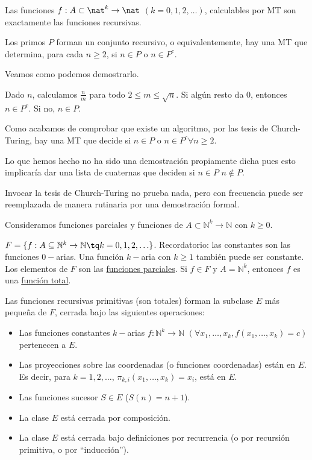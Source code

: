 \begin{theorem}
	Las funciones $f:A\subset\nat^k\to \nat$ $(k=0,1,2,\hdots)$, calculables por MT son exactamente las funciones recursivas.
\end{theorem}

\begin{example}
	Los primos $P$ forman un conjunto recursivo, o equivalentemente, hay una MT que determina, para cada $n\ge2$, si $n\in P$ o $n\in P^c$.

	Veamos como podemos demostrarlo.

	Dado $n$, calculamos $\frac{n}{m}$ para todo $2\le m\le \sqrt{n}$. Si algún resto da $0$, entonces $n\in P^c$. Si no, $n\in P$.

	Como acabamos de comprobar que existe un algoritmo, por las tesis de Church-Turing, hay una MT que decide si $n\in P$ o $n\in P^c \forall n\ge 2$.

	Lo que hemos hecho no ha sido una demostración propiamente dicha pues esto implicaría dar una lista de cuaternas que deciden si $n\in P$  $n\notin P$.
\end{example}

Invocar la tesis de Church-Turing no prueba nada, pero con frecuencia puede ser reemplazada de manera rutinaria por una demostración formal.

Consideramos funciones parciales y funciones de $A\subset\mathbb{N}^k\to \mathbb{N}$ con $k\ge 0$.

\begin{defn}
	$F=\{f:A\subseteq\mathbb{N}^k\to\mathbb{N}\tq k=0,1,2,\hdots\}$.
	Recordatorio: las constantes son las funciones $0-$arias.
	Una función $k-$aria con $k\ge 1$ también puede ser constante.
	Los elementos de $F$ son las \underline{funciones parciales}. Si $f\in F$ y $A=\mathbb{N}^k$, entonces $f$ es una \underline{función total}.
\end{defn}

\begin{defn}
	Las funciones recursivas primitivas (son totales) forman la subclase $E$ más pequeña de $F$, cerrada bajo las siguientes operaciones:
	\begin{itemize}
		\item Las funciones constantes $k-$arias $f:\mathbb{N}^k\to\mathbb{N}$ $(\forall x_1, \hdots, x_k, f(x_1, \hdots, x_k)=c)$ pertenecen a $E$.
		\item Las proyecciones sobre las coordenadas (o funciones coordenadas) están en $E$. Es decir, para $k=1,2,\hdots$, $\pi_{k,i}(x_1, \hdots, x_k)=x_i$, está en $E$.
		\item Las funciones sucesor $S\in E$ ($S(n) = n+1$).
		\item La clase $E$ está cerrada por composición.
		\item La clase $E$ está cerrada bajo definiciones por recurrencia (o por recursión primitiva, o por ``inducción'').
	\end{itemize}
\end{defn}

